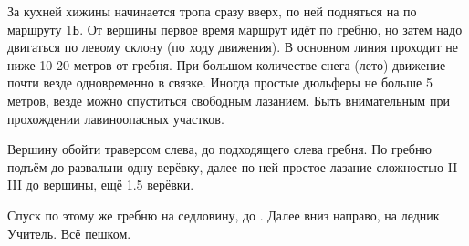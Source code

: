 За кухней хижины \geoLighthouse начинается тропа сразу вверх, по ней
подняться на \geoPeakUchitel по маршруту 1Б. От вершины первое время
маршрут идёт по гребню, но затем надо двигаться по левому склону (по
ходу движения). В основном линия проходит не ниже 10-20 метров от
гребня. При большом количестве снега (лето) движение почти везде
одновременно в связке. Иногда простые дюльферы не больше 5 метров,
везде можно спуститься свободным лазанием. Быть внимательным при
прохождении лавиноопасных участков.

Вершину \geoBaichechekey обойти траверсом слева, до подходящего слева
гребня. По гребню подъём до развальни одну верёвку, далее по ней
простое лазание сложностью II-III до вершины, ещё 1.5 верёвки.

Спуск по этому же гребню на седловину, до
. Далее
вниз направо, на ледник Учитель. Всё пешком.
